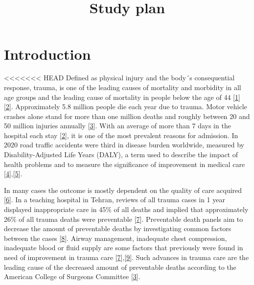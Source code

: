 \documentclass[
]{article}
\title{Study plan}
\author{}
\date{\vspace{-2.5em}}
\begin{document}
\maketitle

\hypertarget{introduction}{%
\section{Introduction}\label{introduction}}

\textless\textless\textless\textless\textless\textless\textless{} HEAD
Defined as physical injury and the body´s consequential response,
trauma, is one of the leading causes of mortality and morbidity in all
age groups and the leading cause of mortality in people below the age of
44 {[}\protect\hyperlink{ref-David2021}{1}{]}
{[}\protect\hyperlink{ref-champion1990}{2}{]}. Approximately 5.8 million
people die each year due to trauma. Motor vehicle crashes alone stand
for more than one million deaths and roughly between 20 and 50 million
injuries annually {[}\protect\hyperlink{ref-Committee2013}{3}{]}. With
an average of more than 7 days in the hospital each stay
{[}\protect\hyperlink{ref-champion1990}{2}{]}, it is one of the most
prevalent reasons for admission. In 2020 road traffic accidents were
third in disease burden worldwide, measured by Disability-Adjusted Life
Years (DALY), a term used to describe the impact of health problems and
to measure the significance of improvement in medical care
{[}\protect\hyperlink{ref-Murray1996}{4}{]},{[}\protect\hyperlink{ref-Haagsma2015}{5}{]}.

In many cases the outcome is mostly dependent on the quality of care
acquired {[}\protect\hyperlink{ref-Dogrul2020}{6}{]}. In a teaching
hospital in Tehran, reviews of all trauma cases in 1 year displayed
inappropriate care in 45\% of all deaths and implied that approximately
26\% of all trauma deaths were preventable
{[}\protect\hyperlink{ref-Zafarghandi2003}{7}{]}. Preventable death
panels aim to decrease the amount of preventable deaths by investigating
common factors between the cases
{[}\protect\hyperlink{ref-Jung2019}{8}{]}. Airway management, inadequate
chest compression, inadequate blood or fluid supply are some factors
that previously were found in need of improvement in trauma care
{[}\protect\hyperlink{ref-Zafarghandi2003}{7}{]},{[}\protect\hyperlink{ref-Maio1996}{9}{]}.
Such advances in trauma care are the leading cause of the decreased
amount of preventable deaths according to the American College of
Surgeons Committee {[}\protect\hyperlink{ref-Committee2013}{3}{]}.
\end{document}
